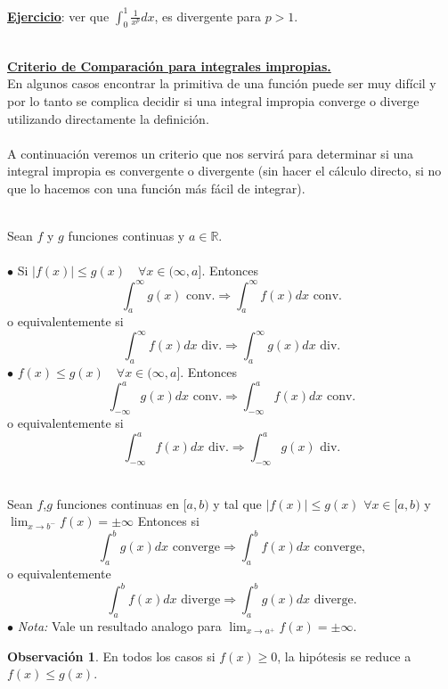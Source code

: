 \documentclass{article}
\theoremstyle{definition}
\newtheorem*{obs}{Observación}
\theoremstyle{remark}
\newcommand\R{\ensuremath{\mathbb{R}}}
\newcommand\infi{\infty}
\begin{document}
\underline{\textbf{Ejercicio}}: ver que $\int_0^1\frac{1}{x^p}dx$, es divergente para $p>1$.\\\\

\pagebreak 

\underline{\textbf{Criterio de Comparación para integrales impropias.}} \\
En algunos casos encontrar la primitiva de una función puede ser muy difícil y por lo tanto se complica decidir si una integral impropia converge o diverge utilizando directamente la definición.
\\\\
 A continuación veremos un criterio que nos servirá para determinar si una integral impropia es convergente o divergente (sin hacer el cálculo directo, si no que lo hacemos con una función más fácil de integrar).
\begin{teo}  \; \\
  Sean $f$ y $g$ funciones continuas y $a \in \R$. \\\\

  $\bullet$ Si $|f(x)| \leq g(x) \quad \forall x \in (\infi,a]$. Entonces $$\int_{a}^{\infi}g(x) \text{ conv.}  \Longrightarrow \int_{a}^{\infi}f(x)dx \text{ conv}.$$
  o equivalentemente si $$
\int_{a}^{\infi}{f(x)dx} \text{ div.} \Longrightarrow \int_{a}^{\infi}{g(x)dx} \text{ div.}
  $$
$\bullet$ $f(x) \leq g(x) \quad \forall x \in (\infi,a]$. Entonces $$
\int_{-\infi}^{a}g(x)dx \text{ conv.} \Longrightarrow \int_{-\infi}^{a}{f(x)dx} \text{ conv.} $$
o equivalentemente si \[
\int_{-\infi}^{a}{f(x)dx} \text{ div.} \Longrightarrow \int_{-\infi}^{a}{g(x)} \text{ div.}
\]
\end{teo}
\pagebreak
\begin{teo} \; \\
  Sean $f$,$g$ funciones continuas en $[a,b)$ y tal que
  $ |f(x)| \leq g(x)$ \quad $ \forall x \in [a,b) $ y
  $\lim_{x \to b^-}f(x) = \pm \infi $ Entonces si
  \[
  \int_a^bg(x)dx \text{ converge} \Longrightarrow \int_a^b f(x)dx \text{ converge,}
  \]
  o equivalentemente
  \[
\int_a^bf(x)dx \text{ diverge} \Longrightarrow \int_a^b g(x)dx \text{ diverge.}
  \]
$\bullet$ \emph{Nota:} Vale un resultado analogo para $\lim_{x \to a^+}{f(x)}=\pm \infi$.
\end{teo}
\begin{obs}
  En todos los casos si $f(x) \geq 0$, la hipótesis se reduce a $f(x) \leq g(x)$.
\end{obs}
\end{document}
